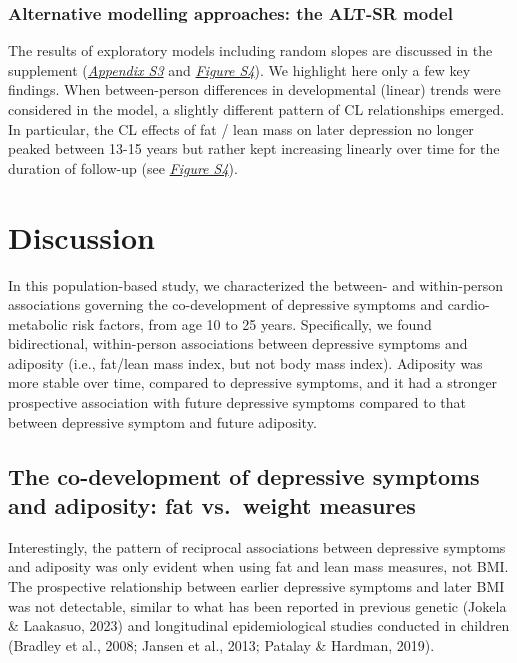 \documentclass[
  letterpaper,
  DIV=11,
  numbers=noendperiod]{scrreport}
\begin{document}
\subsubsection{Alternative modelling approaches: the ALT-SR
model}\label{alternative-modelling-approaches-the-alt-sr-model}

The results of exploratory models including random slopes are discussed
in the supplement (\href{https://osf.io/wyzd8}{\emph{Appendix S3}} and
\href{https://osf.io/wyzd8}{\emph{Figure S4}}). We highlight here only a
few key findings. When between-person differences in developmental
(linear) trends were considered in the model, a slightly different
pattern of CL relationships emerged. In particular, the CL effects of
fat / lean mass on later depression no longer peaked between 13-15 years
but rather kept increasing linearly over time for the duration of
follow-up (see \href{https://osf.io/wyzd8}{\emph{Figure S4}}).

\section{Discussion}\label{discussion-4}

In this population-based study, we characterized the between- and
within-person associations governing the co-development of depressive
symptoms and cardio-metabolic risk factors, from age 10 to 25 years.
Specifically, we found bidirectional, within-person associations between
depressive symptoms and adiposity (i.e., fat/lean mass index, but not
body mass index). Adiposity was more stable over time, compared to
depressive symptoms, and it had a stronger prospective association with
future depressive symptoms compared to that between depressive symptom
and future adiposity.

\subsection{The co-development of depressive symptoms and adiposity: fat
vs.~weight
measures}\label{the-co-development-of-depressive-symptoms-and-adiposity-fat-vs.-weight-measures}

Interestingly, the pattern of reciprocal associations between depressive
symptoms and adiposity was only evident when using fat and lean mass
measures, not BMI. The prospective relationship between earlier
depressive symptoms and later BMI was not detectable, similar to what
has been reported in previous genetic (Jokela \& Laakasuo, 2023) and
longitudinal epidemiological studies conducted in children (Bradley et
al., 2008; Jansen et al., 2013; Patalay \& Hardman, 2019).
\end{document}
